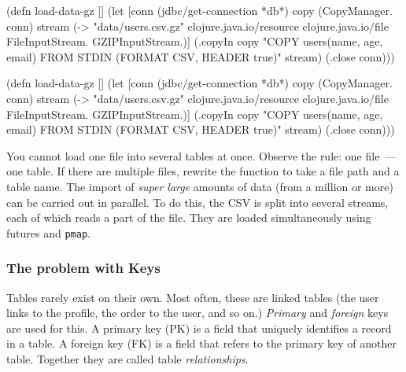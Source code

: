 
\ifx\DEVICETYPE\MOBILE

\begin{english}
  \begin{clojure/lines}
(defn load-data-gz []
  (let [conn
        (jdbc/get-connection *db*)
        copy (CopyManager. conn)
        stream
        (-> "data/users.csv.gz"
            clojure.java.io/resource
            clojure.java.io/file
            FileInputStream.
            GZIPInputStream.)]
   (.copyIn copy
     "COPY users(name, age, email)
      FROM STDIN
      (FORMAT CSV, HEADER true)"
     stream)
   (.close conn)))
  \end{clojure/lines}
\end{english}

\else

\begin{english}
  \begin{clojure/lines}
(defn load-data-gz []
  (let [conn (jdbc/get-connection *db*)
        copy (CopyManager. conn)
        stream (-> "data/users.csv.gz"
                   clojure.java.io/resource
                   clojure.java.io/file
                   FileInputStream.
                   GZIPInputStream.)]
    (.copyIn copy "COPY users(name, age, email)
                   FROM STDIN (FORMAT CSV, HEADER true)"
             stream)
    (.close conn)))
  \end{clojure/lines}
\end{english}

\fi

\mnoindent
You cannot load one file into several tables at once. Observe the rule: one file~--- one table. If there are multiple files, rewrite the function to take a file path and a table name. The import of \emph{super large} amounts of data (from a million or more) can be carried out in parallel. To do this, the CSV is split into several streams, each of which reads a part of the file. They are loaded simultaneously using futures and \verb|pmap|.

\subsubsection*{The problem with Keys}



Tables rarely exist on their own. Most often, these are linked tables (the user links to the profile, the order to the user, and so on.) \emph{Primary} and \emph{foreign} keys are used for this. A primary key (PK) is a field that uniquely identifies a record in a table. A foreign key (FK) is a field that refers to the primary key of another table. Together they are called table \emph{relationships}.


